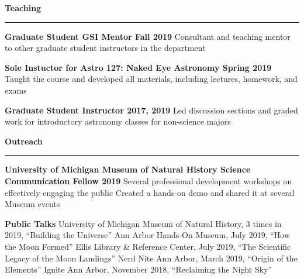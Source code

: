 \documentclass[10pt]{article}
\newcommand{\header}[1]{\vspace{2em}\par \textbf{\large #1}\strut\hrule\vspace{0em}}
\newcommand{\actionHeader}[2]{\textbf{#1 \hfill #2}}
\newcommand{\indentedItem}[1]{\newline\null\qquad #1}
\begin{document}
\header{Teaching}

\actionHeader{Graduate Student GSI Mentor}{Fall 2019}
\indentedItem{Consultant and teaching mentor to other graduate student instructors in the department}

\actionHeader{Sole Instuctor for Astro 127: Naked Eye Astronomy}{Spring 2019}
\indentedItem{Taught the course and developed all materials, including lectures, homework, and exams}

\actionHeader{Graduate Student Instructor}{2017, 2019}
\indentedItem{Led discussion sections and graded work for introductory astronomy classes for non-science majors}




\pagebreak

\header{Outreach}

\actionHeader{University of Michigan Museum of Natural History Science Communication Fellow}{2019}
\indentedItem{Several professional development workshops on effectively engaging the public}
\indentedItem{Created a hands-on demo and shared it at several Museum events}

\actionHeader{Public Talks}{}
\indentedItem{University of Michigan Museum of Natural History, 3 times in 2019, ``Building the Universe''}
\indentedItem{Ann Arbor Hands-On Museum, July 2019, ``How the Moon Formed''}
\indentedItem{Ellis Library \& Reference Center, July 2019, ``The Scientific Legacy of the Moon Landings''}
\indentedItem{Nerd Nite Ann Arbor, March 2019, ``Origin of the Elements''}
\indentedItem{Ignite Ann Arbor, November 2018, ``Reclaiming the Night Sky''}

\end{document}
